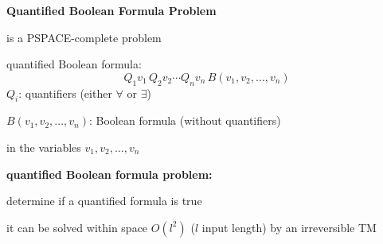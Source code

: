 \documentclass[portrait]{seminar}
\begin{document}
\begin{slide}
{\bf {\large Quantified Boolean Formula Problem}}

\vspace{0.25cm}
is a {\blue PSPACE-complete} problem

\vspace{0.25cm}
quantified Boolean formula:
\[
Q_1 v_1\, Q_2 v_2 \cdots Q_n v_n\, B(v_1,v_2,\ldots,v_n)
\]
\quad $Q_i$: quantifiers (either $\forall$ or $\exists$)

\quad $B(v_1,v_2,\ldots,v_n)$: Boolean formula (without quantifiers)

\hspace{3.15cm} in the variables $v_1,v_2,\ldots,v_n$

\vspace{0.25cm}
{\bf quantified Boolean formula problem:}

determine if a quantified formula is true

\vspace{0.25cm} 
it can be solved within space $O(l^2)$ ($l$ input length) by an
irreversible TM
\end{slide}
\end{document}
